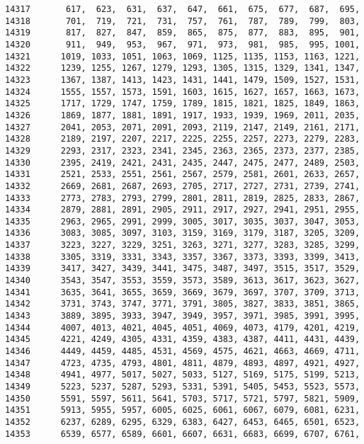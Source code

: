 \begin{Code}
\begin{verbatim}
14317       617,  623,  631,  637,  647,  661,  675,  677,  687,  695, 
14318       701,  719,  721,  731,  757,  761,  787,  789,  799,  803,
14319       817,  827,  847,  859,  865,  875,  877,  883,  895,  901,
14320       911,  949,  953,  967,  971,  973,  981,  985,  995, 1001,
14321      1019, 1033, 1051, 1063, 1069, 1125, 1135, 1153, 1163, 1221,
14322      1239, 1255, 1267, 1279, 1293, 1305, 1315, 1329, 1341, 1347,
14323      1367, 1387, 1413, 1423, 1431, 1441, 1479, 1509, 1527, 1531,
14324      1555, 1557, 1573, 1591, 1603, 1615, 1627, 1657, 1663, 1673, 
14325      1717, 1729, 1747, 1759, 1789, 1815, 1821, 1825, 1849, 1863,
14326      1869, 1877, 1881, 1891, 1917, 1933, 1939, 1969, 2011, 2035,
14327      2041, 2053, 2071, 2091, 2093, 2119, 2147, 2149, 2161, 2171,
14328      2189, 2197, 2207, 2217, 2225, 2255, 2257, 2273, 2279, 2283,
14329      2293, 2317, 2323, 2341, 2345, 2363, 2365, 2373, 2377, 2385,
14330      2395, 2419, 2421, 2431, 2435, 2447, 2475, 2477, 2489, 2503, 
14331      2521, 2533, 2551, 2561, 2567, 2579, 2581, 2601, 2633, 2657,
14332      2669, 2681, 2687, 2693, 2705, 2717, 2727, 2731, 2739, 2741,
14333      2773, 2783, 2793, 2799, 2801, 2811, 2819, 2825, 2833, 2867,
14334      2879, 2881, 2891, 2905, 2911, 2917, 2927, 2941, 2951, 2955,
14335      2963, 2965, 2991, 2999, 3005, 3017, 3035, 3037, 3047, 3053,
14336      3083, 3085, 3097, 3103, 3159, 3169, 3179, 3187, 3205, 3209,
14337      3223, 3227, 3229, 3251, 3263, 3271, 3277, 3283, 3285, 3299,
14338      3305, 3319, 3331, 3343, 3357, 3367, 3373, 3393, 3399, 3413,
14339      3417, 3427, 3439, 3441, 3475, 3487, 3497, 3515, 3517, 3529,
14340      3543, 3547, 3553, 3559, 3573, 3589, 3613, 3617, 3623, 3627,
14341      3635, 3641, 3655, 3659, 3669, 3679, 3697, 3707, 3709, 3713,
14342      3731, 3743, 3747, 3771, 3791, 3805, 3827, 3833, 3851, 3865,
14343      3889, 3895, 3933, 3947, 3949, 3957, 3971, 3985, 3991, 3995,
14344      4007, 4013, 4021, 4045, 4051, 4069, 4073, 4179, 4201, 4219,
14345      4221, 4249, 4305, 4331, 4359, 4383, 4387, 4411, 4431, 4439,
14346      4449, 4459, 4485, 4531, 4569, 4575, 4621, 4663, 4669, 4711,
14347      4723, 4735, 4793, 4801, 4811, 4879, 4893, 4897, 4921, 4927,
14348      4941, 4977, 5017, 5027, 5033, 5127, 5169, 5175, 5199, 5213,
14349      5223, 5237, 5287, 5293, 5331, 5391, 5405, 5453, 5523, 5573,
14350      5591, 5597, 5611, 5641, 5703, 5717, 5721, 5797, 5821, 5909,
14351      5913, 5955, 5957, 6005, 6025, 6061, 6067, 6079, 6081, 6231,
14352      6237, 6289, 6295, 6329, 6383, 6427, 6453, 6465, 6501, 6523,
14353      6539, 6577, 6589, 6601, 6607, 6631, 6683, 6699, 6707, 6761,

\end{verbatim}
\end{Code}
